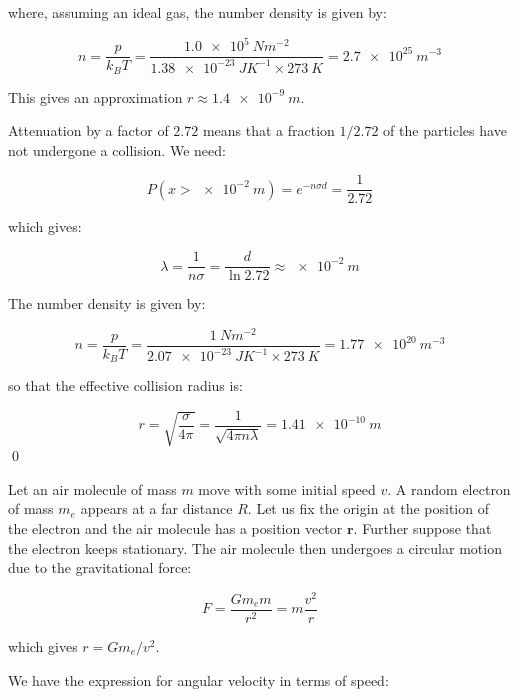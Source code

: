 \documentclass[12pt]{article}
\begin{document}
where, assuming an ideal gas, the number density is given by:

\begin{equation}
    n = \frac{p}{k_{B}T} = \frac{\qty{1.0e5}{Nm^{-2}}}{\qty{1.38e-23}{JK^{-1}} \times \qty{273}{K}} = \qty{2.7e25}{m^{-3}}
\end{equation}

This gives an approximation $r \approx \qty{1.4e-9}{m}$.


Attenuation by a factor of $2.72$ means that a fraction $1/2.72$ of the particles have not undergone a collision. We need:

\begin{equation}
    P(x > \qty{e-2}{m}) = e^{-n\sigma d} = \frac{1}{2.72}
\end{equation}

which gives:

\begin{equation}
    \lambda = \frac{1}{n\sigma} = \frac{d}{\ln{2.72}} \approx \qty{e-2}{m}
\end{equation}

The number density is given by:

\begin{equation}
    n = \frac{p}{k_{B}T} = \frac{\qty{1}{Nm^{-2}}}{\qty{2.07e-23}{JK^{-1}} \times \qty{273}{K}} = \qty{1.77e20}{m^{-3}}
\end{equation}

so that the effective collision radius is:

\begin{equation}
    r = \sqrt{\frac{\sigma}{4\pi}} = \frac{1}{\sqrt{4\pi n\lambda}} = \qty{1.41e-10}{m}
\end{equation}
\qed


Let an air molecule of mass $m$ move with some initial speed $v$. A random electron of mass $m_{e}$ appears at a far distance $R$. Let us fix the origin at the position of the electron and the air molecule has a position vector $\mathbf{r}$. Further suppose that the electron keeps stationary. The air molecule then undergoes a circular motion due to the gravitational force:

\begin{equation}
    F = \frac{Gm_{e}m}{r^{2}} = m \frac{v^{2}}{r}
\end{equation}

which gives $r = Gm_{e}/v^{2}$.

We have the expression for angular velocity in terms of speed:
\end{document}
